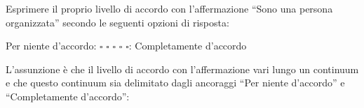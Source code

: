 \documentclass[compress]{beamer}
\begin{document}
\begin{frame}

		
		Esprimere il proprio livello di accordo con l'affermazione ``Sono una persona organizzata'' secondo le seguenti opzioni di risposta: 
		
		\begin{center}
			Per niente d'accordo:	$\square$ \hspace{2mm} $\square$ \hspace{2mm} $\square$ \hspace{2mm} $\square$ \hspace{2mm} $\square$: Completamente d'accordo
		\end{center}

L'assunzione è che il livello di accordo con l'affermazione vari lungo un continuum e che questo continuum sia delimitato dagli ancoraggi ``Per niente d'accordo'' e ``Completamente d'accordo'': 

\pause

\vspace{2.5mm}
\centering
{}

\end{frame}
\end{document}
